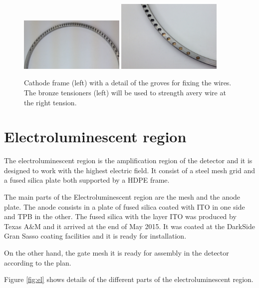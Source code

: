 \begin{figure}[h!]
\centering
\includegraphics[width=0.45\textwidth]{img/cathode_1.jpg}
\includegraphics[width=0.45\textwidth]{img/cathode_tensioners.jpg}
\caption{Cathode frame (left) with a detail of the groves for fixing the wires. The bronze tensioners (left) will be used to strength avery wire at the right tension.} \label{fig:cath}
\end{figure}




\section{Electroluminescent region}

The electroluminescent region is the amplification region of the detector and it is designed to work with the highest electric field.
It consist of a steel mesh grid and a fused silica plate both supported by a HDPE frame.

The main parts of the Electroluminescent region are the mesh and the anode plate. The anode consists in a plate of fused silica coated with ITO in one side and TPB in the other. The fused silica with the layer ITO was produced by Texas A\&M and it arrived at the end of May 2015. It was coated at the DarkSide Gran Sasso coating facilities and it is ready for installation.

On the other hand, the gate mesh it is ready for assembly in the detector according to the plan.

Figure \ref{fig:el} shows details of the different parts of the electroluminescent region.

